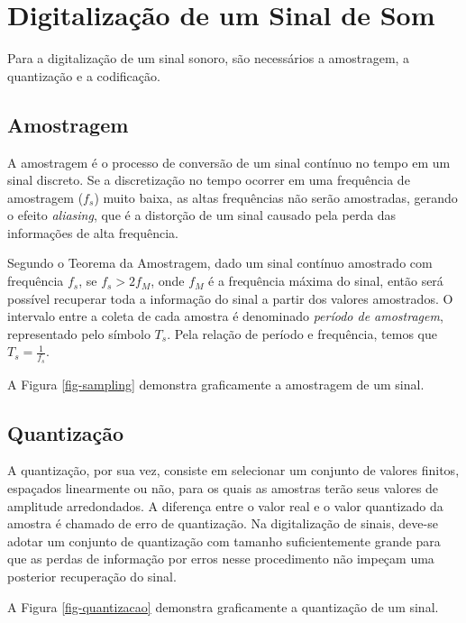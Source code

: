 \section{Digitalização de um Sinal de Som}

Para a digitalização de um sinal sonoro, são necessários a amostragem, a quantização e a codificação. 

\subsection{Amostragem}
A amostragem é o processo de conversão de um sinal contínuo no tempo em um sinal discreto. Se a discretização no tempo ocorrer em uma frequência de amostragem ($f_s$) muito baixa, as altas frequências não serão amostradas, gerando o efeito \textit{aliasing}, que é a distorção de um sinal causado pela perda das informações de alta frequência. 


Segundo o Teorema da Amostragem\cite{lathi2007}, dado um sinal contínuo amostrado com frequência $f_s$, se $f_s > 2f_M$, onde $f_M$ é a frequência máxima do sinal, então será possível recuperar toda a informação do sinal a partir dos valores amostrados. O intervalo entre a coleta de cada amostra é denominado \textit{período de amostragem}, representado pelo símbolo $T_s$. Pela relação de período e frequência, temos que $T_s = \frac{1}{f_s}$.


A Figura \ref{fig-sampling} demonstra graficamente a amostragem de um sinal.


\subsection{Quantização}
A quantização, por sua vez, consiste em selecionar um conjunto de valores finitos, espaçados linearmente ou não, para os quais as amostras terão seus valores de amplitude arredondados. A diferença entre o valor real e o valor quantizado da amostra é chamado de erro de quantização. Na digitalização de sinais, deve-se adotar um conjunto de quantização com tamanho suficientemente grande para que as perdas de informação por erros nesse procedimento não impeçam uma posterior recuperação do sinal.


A Figura \ref{fig-quantizacao} demonstra graficamente a quantização de um sinal.

